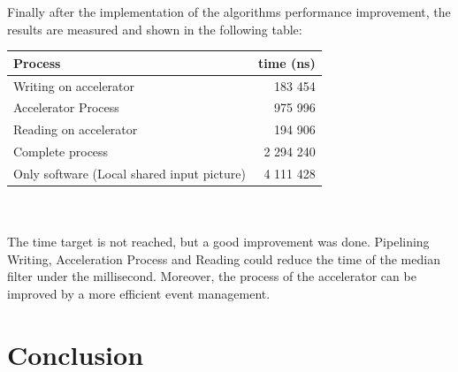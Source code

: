 \documentclass[journal]{IEEEtran}
\begin{document}
Finally after the implementation of the algorithms performance improvement, the results are measured and shown in the following table:\\

\begin{tabular}[!h]{|l|r|}
  \hline
  Process & time (ns)\\
  \hline
  Writing on accelerator & 183 454\\
  \hline
  Accelerator Process & 975 996\\
  \hline
  Reading on accelerator & 194 906\\
  \hline
  Complete process & 2 294 240\\
  \hline
  Only software (Local shared input picture) & 4 111 428\\
  \hline
\end{tabular}\\ \\

The time target is not reached, but a good improvement was done. Pipelining Writing, Acceleration Process and Reading could reduce the time of the median filter under the millisecond. Moreover, the process of the accelerator can be improved by a more efficient event management.


\section{Conclusion}
\end{document}
